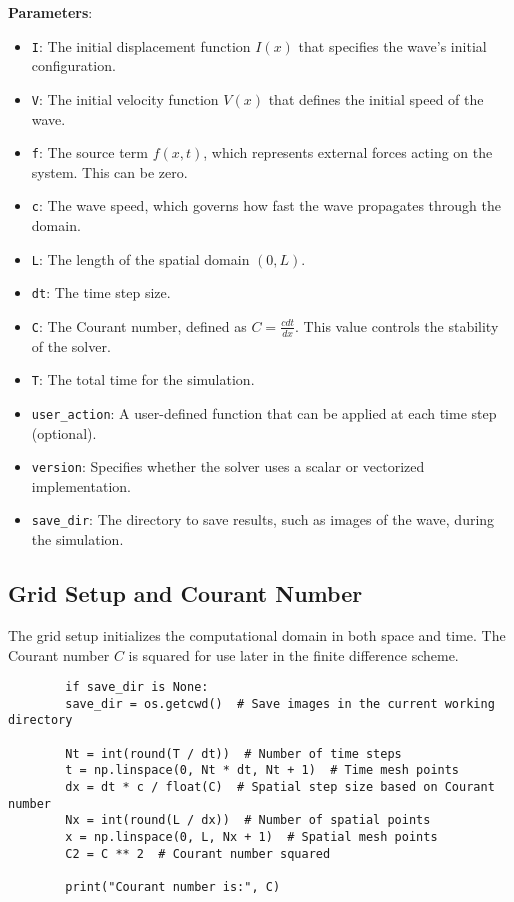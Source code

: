 \documentclass[a4paper, 11pt]{article}
\begin{document}
	\textbf{Parameters}:
	\begin{itemize}
		\item \texttt{I}: The initial displacement function $I(x)$ that specifies the wave’s initial configuration.
		\item \texttt{V}: The initial velocity function $V(x)$ that defines the initial speed of the wave.
		\item \texttt{f}: The source term $f(x,t)$, which represents external forces acting on the system. This can be zero.
		\item \texttt{c}: The wave speed, which governs how fast the wave propagates through the domain.
		\item \texttt{L}: The length of the spatial domain $(0, L)$.
		\item \texttt{dt}: The time step size.
		\item \texttt{C}: The Courant number, defined as $C = \frac{c dt}{dx}$. This value controls the stability of the solver.
		\item \texttt{T}: The total time for the simulation.
		\item \texttt{user\_action}: A user-defined function that can be applied at each time step (optional).
		\item \texttt{version}: Specifies whether the solver uses a scalar or vectorized implementation.
		\item \texttt{save\_dir}: The directory to save results, such as images of the wave, during the simulation.
	\end{itemize}
	
	\subsection{Grid Setup and Courant Number}
	
	The grid setup initializes the computational domain in both space and time. The Courant number $C$ is squared for use later in the finite difference scheme.
	
	\lstset{language=Python}
	\begin{lstlisting}
		if save_dir is None:
		save_dir = os.getcwd()  # Save images in the current working directory
		
		Nt = int(round(T / dt))  # Number of time steps
		t = np.linspace(0, Nt * dt, Nt + 1)  # Time mesh points
		dx = dt * c / float(C)  # Spatial step size based on Courant number
		Nx = int(round(L / dx))  # Number of spatial points
		x = np.linspace(0, L, Nx + 1)  # Spatial mesh points
		C2 = C ** 2  # Courant number squared
		
		print("Courant number is:", C)
	\end{lstlisting}
	
\end{document}
